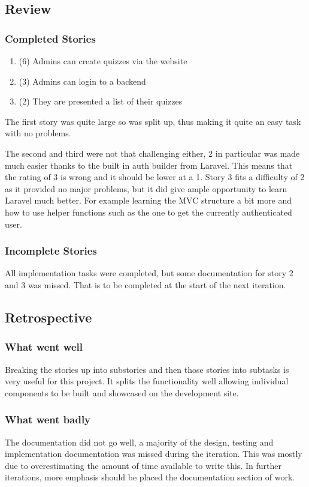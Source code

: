 \subsection{Review}
\subsubsection{Completed Stories}
\begin{enumerate}
	\item (6) Admins can create quizzes via the website
	\item (3) Admins can login to a backend
	\item (2) They are presented a list of their quizzes
\end{enumerate}
The first story was quite large so was split up, thus making it quite an easy task with no problems.

The second and third were not that challenging either, 2 in particular was made much easier thanks to the built in auth builder from Laravel. This means that the rating of 3 is wrong and it should be lower at a 1. Story 3 fits a difficulty of 2 as it provided no major problems, but it did give ample opportunity to learn Laravel much better. For example learning the MVC structure a bit more and how to use helper functions such as the one to get the currently authenticated user.
\subsubsection{Incomplete Stories}
All implementation tasks were completed, but some documentation for story 2 and 3 was missed. That is to be completed at the start of the next iteration.

\subsection{Retrospective}
\subsubsection{What went well}
Breaking the stories up into substories and then those stories into subtasks is very useful for this project. It splits the functionality well allowing individual components to be built and showcased on the development site.
\subsubsection{What went badly}
The documentation did not go well, a majority of the design, testing and implementation documentation was missed during the iteration. This was mostly due to overestimating the amount of time available to write this. In further iterations, more emphasis should be placed the documentation section of work.
\newpage
